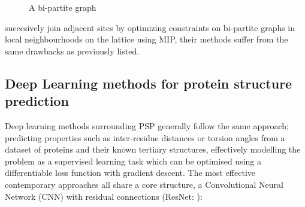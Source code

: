 \begin{figure}[!htb]
\begin{center}
\end{center}
\caption{A bi-partite graph}
\end{figure}
\cite{Yanev2017} succesively join adjacent sites by optimizing constraints on bi-partite graphs in local neighbourhoods
on the lattice using MIP, their methods suffer from the same drawbacks as previously listed.
\subsection{Deep Learning methods for protein structure prediction}
Deep learning methods surrounding PSP generally follow the same approach; predicting properties
such as inter-residue distances or torsion angles from a dataset of proteins and their known tertiary structures,
effectively modelling the problem as a supervised learning task which can be optimised using a differentiable loss 
function with gradient descent.
The most effective contemporary approaches all share a core structure, a Convolutional Neural Network (CNN)
with residual connections (ResNet: \cite{He2016}):

